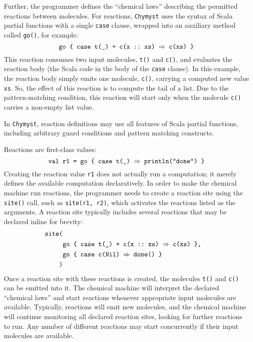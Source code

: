 \documentclass[sigplan,10pt,review,anonymous]{acmart}\settopmatter{printfolios=true}
\begin{document}
Further, the programmer defines the ``chemical laws'' describing
the permitted reactions between molecules. For reactions, \texttt{Chymyst}
uses the syntax of Scala partial functions with a single \texttt{case}
clause, wrapped into an auxiliary method called \texttt{go()}, for
example:
\[
\text{\texttt{go \{ case t(\_) + c(x ::~xs) \ensuremath{\Rightarrow} c(xs) \}}}
\]
This reaction consumes two input molecules, \texttt{t()} and \texttt{c()},
and evaluates the reaction body (the Scala code in the body of the
\texttt{case} clause). In this example, the reaction body simply emits
one molecule, \texttt{c()}, carrying a computed new value \texttt{xs}.
So, the effect of this reaction is to compute the tail of a list.
Due to the pattern-matching condition, this reaction will start only
when the molecule \texttt{c()} carries a non-empty list value.

In \texttt{Chymyst}, reaction definitions may use all features of
Scala partial functions, including arbitrary guard conditions and
pattern matching constructs.

Reactions are first-class values:
\[
\text{\texttt{val r1 = go \{ case t(\_) \ensuremath{\Rightarrow} println("done") \}}}
\]
Creating the reaction value \texttt{r1} does not actually run a computation;
it merely defines the available computation declaratively. In order
to make the chemical machine run reactions, the programmer needs to
create a reaction site using the \texttt{site()} call, such as \texttt{site(r1,
r2)}, which activates the reactions listed as the arguments. A reaction
site typically includes several reactions that may be declared inline
for brevity:
\begin{align*}
\text{\texttt{site(}}\\
 & \text{\texttt{go \{ case t(\_) + c(x ::~xs) \ensuremath{\Rightarrow} c(xs) \},}}\\
 & \text{\text{\texttt{go \{ case c(Nil) }}\texttt{\ensuremath{\Rightarrow} done() \}}}\\
\text{\texttt{)}}
\end{align*}
Once a reaction site with these reactions is created, the molecules
\texttt{t()} and \texttt{c()} can be emitted into it. The chemical
machine will interpret the declared ``chemical laws'' and start
reactions whenever appropriate input molecules are available. Typically,
reactions will emit new molecules, and the chemical machine will continue
monitoring all declared reaction sites, looking for further reactions
to run. Any number of
different reactions may start concurrently if their input molecules
are available.
\end{document}
